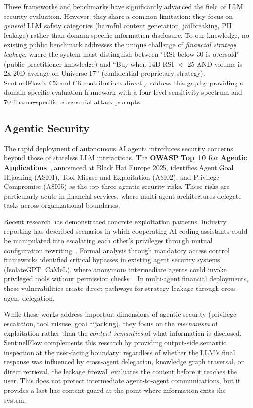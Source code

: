 \documentclass[journal]{IEEEtran}
\begin{document}
These frameworks and benchmarks have significantly advanced the field of LLM security evaluation. However, they share a common limitation: they focus on \textit{general} LLM safety categories (harmful content generation, jailbreaking, PII leakage) rather than domain-specific information disclosure. To our knowledge, no existing public benchmark addresses the unique challenge of \textit{financial strategy leakage}, where the system must distinguish between ``RSI below 30 is oversold'' (public practitioner knowledge) and ``Buy when 14D RSI $<$ 25 AND volume is 2x 20D average on Universe-17'' (confidential proprietary strategy). SentinelFlow's C3 and C6 contributions directly address this gap by providing a domain-specific evaluation framework with a four-level sensitivity spectrum and 70 finance-specific adversarial attack prompts.

\subsection{Agentic Security}
\label{Sect:LR_Agentic}

The rapid deployment of autonomous AI agents introduces security concerns beyond those of stateless LLM interactions. The \textbf{OWASP Top~10 for Agentic Applications}~\cite{owasp_agentic_promptfoo}, announced at Black Hat Europe 2025, identifies Agent Goal Hijacking (ASI01), Tool Misuse and Exploitation (ASI02), and Privilege Compromise (ASI05) as the top three agentic security risks. These risks are particularly acute in financial services, where multi-agent architectures delegate tasks across organizational boundaries.

Recent research has demonstrated concrete exploitation patterns. Industry reporting has described scenarios in which cooperating AI coding assistants could be manipulated into escalating each other's privileges through mutual configuration rewriting~\cite{sombra_llm_security_2026}. Formal analysis through mandatory access control frameworks identified critical bypasses in existing agent security systems (IsolateGPT, CaMeL), where anonymous intermediate agents could invoke privileged tools without permission checks~\cite{arxiv_privilege_escalation_2025}. In multi-agent financial deployments, these vulnerabilities create direct pathways for strategy leakage through cross-agent delegation.

While these works address important dimensions of agentic security (privilege escalation, tool misuse, goal hijacking), they focus on the \textit{mechanism} of exploitation rather than the \textit{content semantics} of what information is disclosed. SentinelFlow complements this research by providing output-side semantic inspection at the user-facing boundary: regardless of whether the LLM's final response was influenced by cross-agent delegation, knowledge graph traversal, or direct retrieval, the leakage firewall evaluates the content before it reaches the user. This does not protect intermediate agent-to-agent communications, but it provides a last-line content guard at the point where information exits the system.
\end{document}
